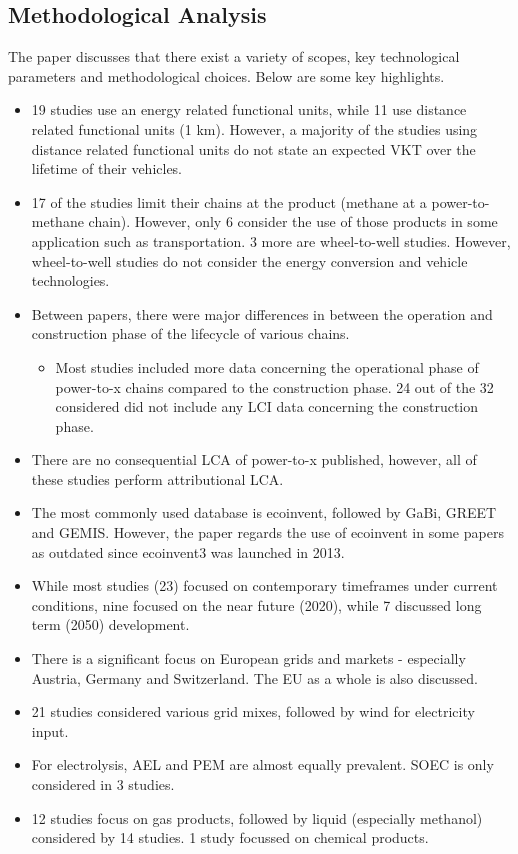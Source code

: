 \documentclass[a4paper]{article}
\begin{document}
\subsection{Methodological Analysis}
The paper discusses that there exist a variety of scopes, key technological parameters and methodological choices. Below are some key highlights.
    \begin{itemize}
        \item 19 studies use an energy related functional units, while 11 use distance related functional units (1 km). However, a majority of the studies using distance related functional units do not state an expected VKT over the lifetime of their vehicles.
        \item 17 of the studies limit their chains at the product (methane at a power-to-methane chain). However, only 6 consider the use of those products in some application such as transportation. 3 more are wheel-to-well studies. However, wheel-to-well studies do not consider the energy conversion and vehicle technologies.
        \item Between papers, there were major differences in between the operation and construction phase of the lifecycle of various chains.
        \begin{itemize}
            \item Most studies included more data concerning the operational phase of power-to-x chains compared to the construction phase. 24 out of the 32 considered did not include any LCI data concerning the construction phase. 
        \end{itemize}
        \item There are no consequential LCA of power-to-x published, however, all of these studies perform attributional LCA.
        \item The most commonly used database is ecoinvent, followed by GaBi, GREET and GEMIS. However, the paper regards the use of ecoinvent in some papers as outdated since ecoinvent3 was launched in 2013.
        \item While most studies (23) focused on contemporary timeframes under current conditions, nine focused on the near future (2020), while 7 discussed long term (2050) development.
        \item There is a significant focus on European grids and markets - especially Austria, Germany and Switzerland. The EU as a whole is also discussed.
        \item 21 studies considered various grid mixes, followed by wind for electricity input. \item For electrolysis, AEL and PEM are almost equally prevalent. SOEC is only considered in 3 studies.
        \item 12 studies focus on gas products, followed by liquid (especially methanol) considered by 14 studies. 1 study focussed on chemical products.
    \end{itemize}
\end{document}
